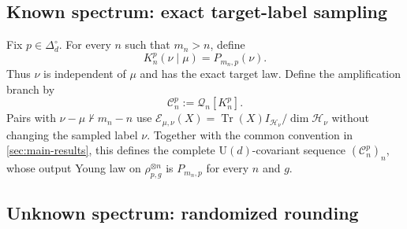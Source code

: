 \documentclass[11pt]{article}
\theoremstyle{remark}
\theoremstyle{plain}
\newcommand{\cC}{\mathcal C}
\newcommand{\cE}{\mathcal E}
\newcommand{\cH}{\mathcal H}
\newcommand{\U}{\mathrm U}
\newcommand{\Tr}{\operatorname{Tr}}
\newcommand{\ot}{\otimes}
\begin{document}
\subsection{Known spectrum: exact target-label sampling}
\label{sec:known-label-kernel}

Fix \(p\in\Delta_d^\circ\).  For every \(n\) such that \(m_n>n\), define
\[
  K_n^p(\nu\mid\mu)=P_{m_n,p}(\nu).
\]
Thus \(\nu\) is independent of \(\mu\) and has the exact target law.  Define
the amplification branch by
\[
  \cC_n^p:=\mathcal Q_n[K_n^p].
\]
Pairs with
\(\nu-\mu\not\vdash m_n-n\) use
\(\cE_{\mu,\nu}(X)=\Tr(X)I_{\cH_\nu}/\dim\cH_\nu\) without changing the
sampled label \(\nu\).  Together with the common convention in
\cref{sec:main-results}, this defines the complete \(\U(d)\)-covariant sequence
\((\cC_n^p)_n\), whose output Young law on \(\rho_{p,g}^{\ot n}\) is
\(P_{m_n,p}\) for every \(n\) and \(g\).

\subsection{Unknown spectrum: randomized rounding}
\label{sec:unknown-label-kernel}
\end{document}

